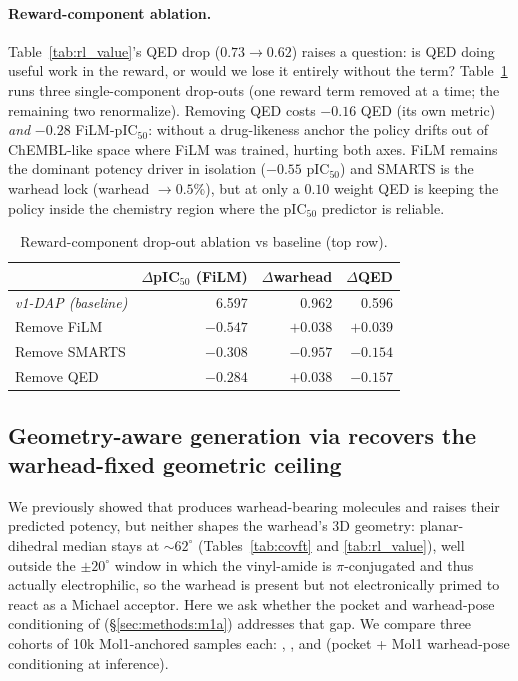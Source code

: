 \paragraph{Reward-component ablation.}\label{sec:results:ablation} Table~\ref{tab:rl_value}'s QED drop ($0.73 \to 0.62$) raises a question: is QED doing useful work in the reward, or would we lose it entirely without the term? Table~\ref{tab:ablation} runs three single-component drop-outs (one reward term removed at a time; the remaining two renormalize). Removing QED costs $-0.16$ QED (its own metric) \emph{and} $-0.28$ FiLM-pIC$_{50}$: without a drug-likeness anchor the policy drifts out of ChEMBL-like space where FiLM was trained, hurting both axes. FiLM remains the dominant potency driver in isolation ($-0.55$ pIC$_{50}$) and SMARTS is the warhead lock (warhead $\to 0.5\%$), but at only a $0.10$ weight QED is keeping the policy inside the chemistry region where the pIC$_{50}$ predictor is reliable.

\begin{table}[H]
\centering
\caption{Reward-component drop-out ablation vs \Cvdap{} baseline (top row).}
\label{tab:ablation}
\small
\begin{tabular}{lrrr}
\toprule
                                  & \textbf{$\Delta$pIC$_{50}$ (FiLM)} & \textbf{$\Delta$warhead} & \textbf{$\Delta$QED} \\
\midrule
\textit{v1-DAP (baseline)}        & 6.597                & 0.962                  & 0.596 \\
\midrule
Remove FiLM                       & $\mathbf{-0.547}$    & $+0.038$               & $+0.039$ \\
Remove SMARTS                     & $-0.308$             & $\mathbf{-0.957}$      & $\mathbf{-0.154}$ \\
Remove QED                        & $-0.284$             & $+0.038$               & $\mathbf{-0.157}$ \\
\bottomrule
\end{tabular}
\end{table}

\subsection{Geometry-aware generation via \Cvcond{} recovers the warhead-fixed geometric ceiling}
\label{sec:results:m1a}

We previously showed that \Cvcovaft{} produces warhead-bearing molecules and \Cvdap{} raises their predicted potency, but neither shapes the warhead's 3D geometry: planar-dihedral median stays at $\sim 62^\circ$ (Tables~\ref{tab:covft} and \ref{tab:rl_value}), well outside the $\pm 20^\circ$ window in which the vinyl-amide is $\pi$-conjugated and thus actually electrophilic, so the warhead is present but not electronically primed to react as a Michael acceptor. Here we ask whether the pocket and warhead-pose conditioning of \Cvcond{} (\S\ref{sec:methods:m1a}) addresses that gap. We compare three cohorts of 10k Mol1-anchored samples each: \textbf{\Cvcovaft{}}, \textbf{\Cvdap{}}, and \textbf{\Cvcond{}} (pocket + Mol1 warhead-pose conditioning at inference).

